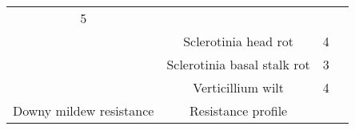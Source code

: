 \documentclass[a4paper]{article}
\begin{document}
\begin{longtable}[]{@{}cccc@{}}
\begin{minipage}[t]{0.09\columnwidth}
5\strut
\end{minipage} & \begin{minipage}[t]{0.29\columnwidth}\centering\strut
\strut
\end{minipage}\tabularnewline
\begin{minipage}[t]{0.24\columnwidth}\centering\strut
\strut
\end{minipage} & \begin{minipage}[t]{0.28\columnwidth}\centering\strut
Sclerotinia head rot\strut
\end{minipage} & \begin{minipage}[t]{0.09\columnwidth}\centering\strut
4\strut
\end{minipage} & \begin{minipage}[t]{0.29\columnwidth}\centering\strut
\strut
\end{minipage}\tabularnewline
\begin{minipage}[t]{0.24\columnwidth}\centering\strut
\strut
\end{minipage} & \begin{minipage}[t]{0.28\columnwidth}\centering\strut
Sclerotinia basal stalk rot\strut
\end{minipage} & \begin{minipage}[t]{0.09\columnwidth}\centering\strut
3\strut
\end{minipage} & \begin{minipage}[t]{0.29\columnwidth}\centering\strut
\strut
\end{minipage}\tabularnewline
\begin{minipage}[t]{0.24\columnwidth}\centering\strut
\strut
\end{minipage} & \begin{minipage}[t]{0.28\columnwidth}\centering\strut
Verticillium wilt\strut
\end{minipage} & \begin{minipage}[t]{0.09\columnwidth}\centering\strut
4\strut
\end{minipage} & \begin{minipage}[t]{0.29\columnwidth}\centering\strut
\strut
\end{minipage}\tabularnewline
\begin{minipage}[t]{0.24\columnwidth}\centering\strut
Downy mildew resistance\strut
\end{minipage} & \begin{minipage}[t]{0.28\columnwidth}\centering\strut
Resistance profile\strut
\end{minipage} & \begin{minipage}[t]{0.09\columnwidth}\centering\strut

\end{minipage}
\end{longtable}
\end{document}
